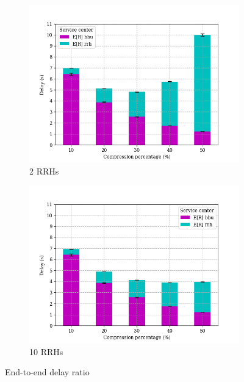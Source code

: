 \documentclass[11pt,a4paper,oneside, openright]{article}
\begin{document}
\begin{figure}[h]
\centering
\begin{subfigure}{.5\textwidth}
  \centering
  \includegraphics[width=\linewidth]{images/response-time-2}
  \caption{2 RRHs}
  \label{fig:response-time-2}
\end{subfigure}%
\begin{subfigure}{.5\textwidth}
  \centering
  \includegraphics[width=\linewidth]{images/response-time-10}
  \caption{10 RRHs}
  \label{fig:response-time-10}
\end{subfigure}
\caption{End-to-end delay ratio}
\label{fig:response-time}
\end{figure}

\newpage
\end{document}
